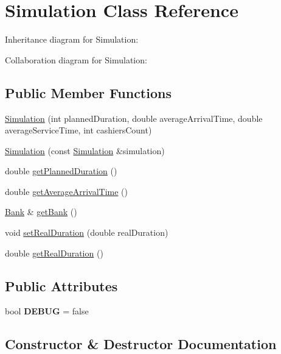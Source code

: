 \hypertarget{classSimulation}{}\section{Simulation Class Reference}
\label{classSimulation}


Inheritance diagram for Simulation\+:


Collaboration diagram for Simulation\+:
\subsection*{Public Member Functions}
\begin{DoxyCompactItemize}
\item 
\hyperlink{classSimulation_a2ed2c8e55dfdfb898cb0288fbc826056}{Simulation} (int planned\+Duration, double average\+Arrival\+Time, double average\+Service\+Time, int cashiers\+Count)
\item 
\hyperlink{classSimulation_ad82aba6067f881a5c364ea6b6b317325}{Simulation} (const \hyperlink{classSimulation}{Simulation} \&simulation)
\item 
double \hyperlink{classSimulation_a242c58ccefca3705bdc47ee7827c24fe}{get\+Planned\+Duration} ()
\item 
double \hyperlink{classSimulation_a1e4f97c6011a0cbce91c5034c917ab46}{get\+Average\+Arrival\+Time} ()
\item 
\hyperlink{classBank}{Bank} \& \hyperlink{classSimulation_a280ef124f9f6395a446b36a9dd45e4bc}{get\+Bank} ()
\item 
void \hyperlink{classSimulation_af7d8147539e8ea62f83c44fa0431e27d}{set\+Real\+Duration} (double real\+Duration)
\item 
double \hyperlink{classSimulation_a18218154310af27c087def0936690346}{get\+Real\+Duration} ()
\end{DoxyCompactItemize}
\subsection*{Public Attributes}
\begin{DoxyCompactItemize}
\item 
\mbox{\label{classSimulation_ae125e30e669048458632583d63c6683e}} 
bool {\bfseries D\+E\+B\+UG} = false
\end{DoxyCompactItemize}


\subsection{Constructor \& Destructor Documentation}
\mbox{\label{classSimulation_a2ed2c8e55dfdfb898cb0288fbc826056}} 
